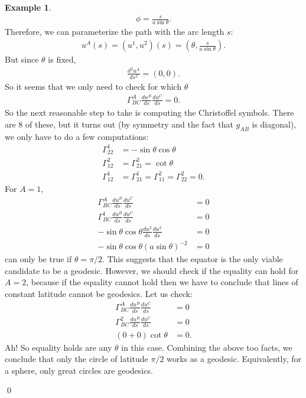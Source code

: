 \documentclass{book}
\theoremstyle{definition}
\newtheorem{exmp}{Example}[section]
\begin{document}
\begin{exmp}
	\begin{align*}
	\phi = \frac{s}{a\sin\theta}.
	\end{align*}
	Therefore, we can parameterize the path with the arc length $s$:
	\begin{align*}
	u^A(s) = (u^1,u^2)(s) = \left(\theta, \frac{s}{a\sin\theta}\right).
	\end{align*}
	But since $\theta$ is fixed,
	\begin{align*}
	\frac{d^2u^A}{ds^2} = (0,0).
	\end{align*}
	So it seems that we only need to check for which $\theta$
	\begin{align*}
	\Gamma^{A}_{BC}\frac{du^B}{ds}\frac{du^C}{ds} = 0.
	\end{align*}
	So the next reasonable step to take is computing the Christoffel symbols. There are 8 of these, but it turns out (by symmetry and the fact that $g_{AB}$ is diagonal), we only have to do a few computations:
	\begin{align*}
	\Gamma^1_{22} &= -\sin\theta\cos\theta\\
	\Gamma^2_{12} &= \Gamma^2_{21} = \cot\theta\\
	\Gamma^1_{12} &= \Gamma^1_{21} = \Gamma^2_{11} = \Gamma^2_{22} = 0.
	\end{align*}
	For $A = 1$, 
	\begin{align*}
	\Gamma^{A}_{BC}\frac{du^B}{ds}\frac{du^C}{ds} &= 0\\
	\Gamma^{1}_{BC}\frac{du^B}{ds}\frac{du^C}{ds} &= 0\\
	-\sin\theta\cos\theta\frac{du^2}{ds}\frac{du^2}{ds} &= 0\\
	-\sin\theta\cos\theta\left(a\sin\theta \right)^{-2} &= 0
	\end{align*}
	can only be true if $\theta = \pi/2$. This suggests that the equator is the only viable candidate to be a geodesic. However, we should check if the equality can hold for $A=2$, because if the equality cannot hold then we have to conclude that lines of constant latitude cannot be geodesics. Let us check:
	\begin{align*}
	\Gamma^{A}_{BC}\frac{du^B}{ds}\frac{du^C}{ds} &= 0\\
	\Gamma^{2}_{BC}\frac{du^B}{ds}\frac{du^C}{ds} &= 0\\
	(0+0)\cot\theta &= 0.
	\end{align*}
	Ah! So equality holds are any $\theta$ in this case. Combining the above too facts, we conclude that only the circle of latitude $\pi/2$ works as a geodesic. Equivalently, for a sphere, only great circles are geodesics.
\end{exmp}\qed
\end{document}
